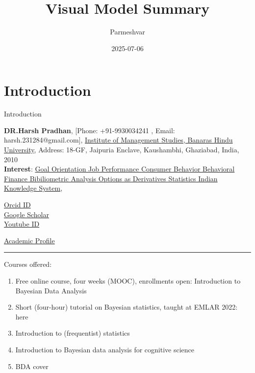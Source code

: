 \documentclass[
  letterpaper,
  DIV=11,
  numbers=noendperiod]{scrreprt}
\title{Visual Model Summary}
\author{Parmeshvar}
\date{2025-07-06}
\providecommand{\tightlist}{%
  \setlength{\itemsep}{0pt}\setlength{\parskip}{0pt}}
\renewcommand*\contentsname{Table of contents}
\newcommand\contentsname{Table of contents}
\begin{document}
\maketitle

\renewcommand*\contentsname{Table of contents}
{
\hypersetup{linkcolor=}
\setcounter{tocdepth}{2}
\tableofcontents
}


\chapter{Introduction}\label{introduction}

Introduction

\textbf{DR.Harsh Pradhan}, {[}Phone: +91-9930034241 , Email:
harsh.231284@gmail.com{]},
\href{http://www.uni-potsdam.de/en/university-of-potsdam.html}{Institute
of Management Studies, Banaras Hindu University}, Address: 18-GF,
Jaipuria Enclave, Kaushambhi, Ghaziabad, India, 2010\\
\textbf{Interest}:
\href{http://www.uni-potsdam.de/humfak/hum-forschungsschwerpunkte/forschungscluster-sprache.html}{Goal
Orientation Job Performance Consumer Behavior Behavioral Finance
Bibiliometric Analysis Options as Derivatives Statistics Indian
Knowledge System},

\href{https://orcid.org/0000-0002-3332-3610}{Orcid ID}\\
\href{https://scholar.google.com/citations?user=8l5MEd0AAAAJ&hl=en&oi=sra}{Google
Scholar}\\
\href{http://www.youtube.com/@dr.harshpradhan742}{Youtube ID}

\href{https://bhu.ac.in/Site/FacultyProfile/1_5?FA000562}{Academic
Profile}

\begin{center}\rule{0.5\linewidth}{0.5pt}\end{center}

Courses offered:

\begin{enumerate}
\def\labelenumi{\arabic{enumi}.}
\tightlist
\item
  Free online course, four weeks (MOOC), enrollments open: Introduction
  to Bayesian Data Analysis
\item
  Short (four-hour) tutorial on Bayesian statistics, taught at EMLAR
  2022: here
\item
  Introduction to (frequentist) statistics
\item
  Introduction to Bayesian data analysis for cognitive science
\item
  BDA cover
\end{enumerate}
\end{document}
